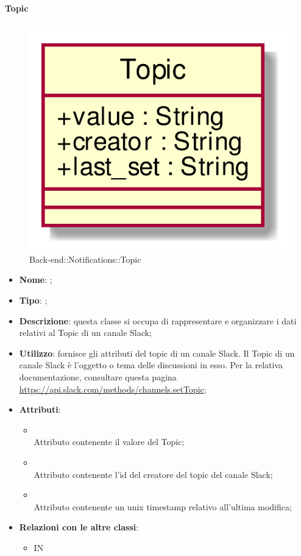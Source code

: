 \FloatBarrier

\hypertarget{Topic_label}{\paragraph{Topic}}
\begin{figure}[h]
	\centering
	\includegraphics[width=\textwidth,height=\textheight,keepaspectratio]{images/ClassTopic.png}
	\caption{Back-end::Notifications::Topic}
\end{figure}
\begin{itemize}
	\item \textbf{Nome}: ;
	\item \textbf{Tipo}: ;
	\item \textbf{Descrizione}: questa classe si occupa di rappresentare e organizzare i dati relativi al Topic di un canale Slack;
	\item \textbf{Utilizzo}: fornisce gli attributi del topic di un canale Slack.
Il Topic di un canale Slack è l'oggetto o tema delle discussioni in esso.
Per la relativa documentazione, consultare questa pagina \url{https://api.slack.com/methods/channels.setTopic};
	\item \textbf{Attributi}:
	\begin{itemize}
		\item[]  \\
		Attributo contenente il valore del Topic;
		\item[]  \\
		Attributo contenente l'id del creatore del topic del canale Slack;
		\item[]  \\
		Attributo contenente un unix timestamp relativo all'ultima modifica;
	\end{itemize}
	\item \textbf{Relazioni con le altre classi}:
	\begin{itemize}
		\item IN \hyperlink{NotificationChannel_label}{}
	\end{itemize}
\end{itemize}
